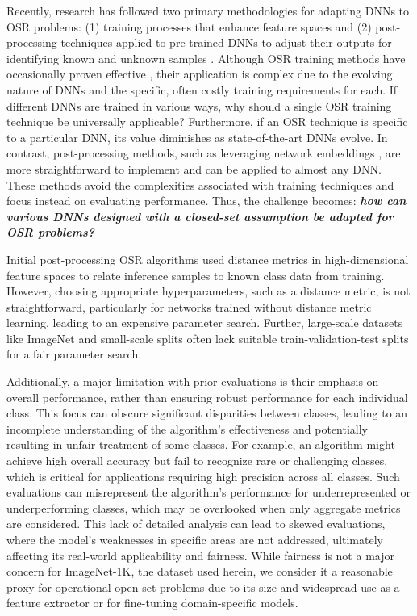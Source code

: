 Recently, research has followed two primary methodologies for adapting DNNs to OSR problems: (1) training processes that enhance feature spaces and (2) post-processing techniques applied to pre-trained DNNs to adjust their outputs for identifying known and unknown samples \cite{roady2020open}.
Although OSR training methods have occasionally proven effective \cite{zhou_learning_2021, miller2021class, dhamija2018reducing}, their application is complex due to the evolving nature of DNNs and the specific, often costly training requirements for each.
If different DNNs are trained in various ways, why should a single OSR training technique be universally applicable?
Furthermore, if an OSR technique is specific to a particular DNN, its value diminishes as state-of-the-art DNNs evolve.
In contrast, post-processing methods, such as leveraging network embeddings \cite{bendale2016openmax}, are more straightforward to implement and can be applied to almost any DNN.
These methods avoid the complexities associated with training techniques and focus instead on evaluating performance.
Thus, the challenge becomes: \textbf{\emph{how can various DNNs designed with a closed-set assumption be adapted for OSR problems?}}

Initial post-processing OSR algorithms \cite{bendale2016openmax, rudd2017evm} used distance metrics in high-dimensional feature spaces to relate inference samples to known class data from training.
However, choosing appropriate hyperparameters, such as a distance metric, is not straightforward, particularly for networks trained without distance metric learning, leading to an expensive parameter search.
Further, large-scale datasets like ImageNet \cite{deng2009imagenet} and small-scale splits \cite{neal2018counterfactual, perera_generative-discriminative_2020, yang2020convolutional, geng2020recent, zhou_learning_2021} often lack suitable train-validation-test splits for a fair parameter search.

Additionally, a major limitation with prior evaluations is their emphasis on overall performance, rather than ensuring robust performance for each individual class.
This focus can obscure significant disparities between classes, leading to an incomplete understanding of the algorithm's effectiveness and potentially resulting in unfair treatment of some classes.
For example, an algorithm might achieve high overall accuracy but fail to recognize rare or challenging classes, which is critical for applications requiring high precision across all classes.
Such evaluations can misrepresent the algorithm’s performance for underrepresented or underperforming classes, which may be overlooked when only aggregate metrics are considered.
This lack of detailed analysis can lead to skewed evaluations, where the model’s weaknesses in specific areas are not addressed, ultimately affecting its real-world applicability and fairness.
While fairness is not a major concern for ImageNet-1K, the dataset used herein, we consider it a reasonable proxy for operational open-set problems due to its size and widespread use as a feature extractor or for fine-tuning domain-specific models.

